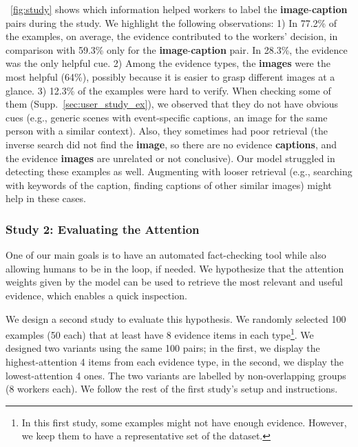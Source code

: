 ~\autoref{fig:study} shows which information helped workers to label the \textbf{\textcolor{myOrange}{image}}-\textbf{\textcolor{myblue}{caption}} pairs during the study. We highlight the following observations: 1) In 77.2\% of the examples, on average, the evidence contributed to the workers' decision, in comparison with 59.3\% only for the \textbf{\textcolor{myOrange}{image}}-\textbf{\textcolor{myblue}{caption}} pair. In 28.3\%, the evidence was the only helpful cue. 2) Among the evidence types, the \textbf{\textcolor{myOrange}{images}} were the most helpful (64\%), possibly because it is easier to grasp different images at a glance. 3) 12.3\% of the examples were hard to verify. When checking some of them (Supp.~\ref{sec:user_study_ex}), we observed that they do not have obvious cues (e.g., generic scenes with event-specific captions, an image for the same person with a similar context). Also, they sometimes had poor retrieval (the inverse search did not find the \textbf{\textcolor{myOrange}{image}}, so there are no evidence \textbf{\textcolor{myblue}{captions}}, and the evidence \textbf{\textcolor{myOrange}{images}} are unrelated or not conclusive). Our model struggled in detecting these examples as well. Augmenting with looser retrieval (e.g., searching with keywords of the caption, finding captions of other similar images) might help in these cases.
\vspace{-2mm}
\subsubsection{Study 2: Evaluating the Attention}
One of our main goals is to have an automated fact-checking tool while also allowing humans to be in the loop, if needed. We hypothesize that the attention weights given by the model can be used to retrieve the most relevant and useful evidence, which enables a quick inspection.

We design a second study to evaluate this hypothesis. We randomly selected 100 examples (50 each) that at least have 8 evidence items in each type\footnote{In this first study, some examples might not have enough evidence. However, we keep them to have a representative set of the dataset.}. We designed two variants using the same 100 pairs; in the first, we display the highest-attention 4 items from each evidence type, in the second, we display the lowest-attention 4 ones. The two variants are labelled by non-overlapping groups (8 workers each). We follow the rest of the first study's setup and instructions.

